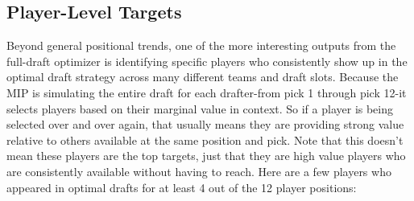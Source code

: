 \documentclass{article}
\begin{document}
\subsection{Player-Level Targets}
Beyond general positional trends, one of the more interesting outputs from the full-draft optimizer is identifying specific players who consistently show up in the optimal draft strategy across many different teams and draft slots.
Because the MIP is simulating the entire draft for each drafter-from pick 1 through pick 12-it selects players based on their marginal value in context. 
So if a player is being selected over and over again, that usually means they are providing strong value relative to others available at the same position and pick. 
Note that this doesn't mean these players are the top targets, just that they are high value players who are consistently available without having to reach.
Here are a few players who appeared in optimal drafts for at least 4 out of the 12 player positions:
\end{document}
